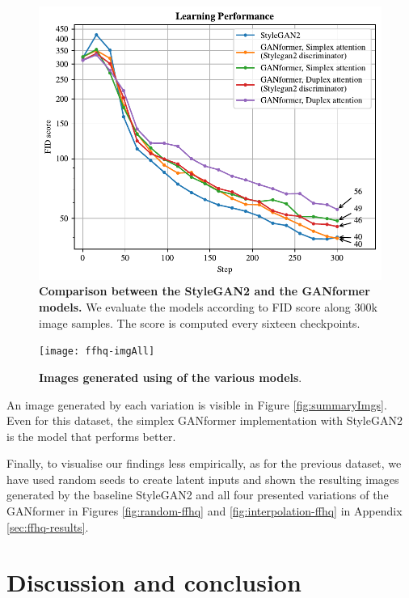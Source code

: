 \documentclass{article}
\begin{document}
\begin{figure}[htpb]				
	\centering
	\includegraphics[width=.6\linewidth]{FIDscore-ffhq.pdf}
	\caption{\textbf{Comparison between the StyleGAN2 and the GANformer models.} We evaluate 
	the models according to FID score along 300k image samples. The score is computed every 
	sixteen checkpoints.}
	\label{fig:performance-ffhq}
\end{figure}

\begin{figure}[htb]
	\centering
	\texttt{[image: ffhq-imgAll]}
	\caption{\textbf{Images generated using of the various models}.} 
	\label{fig:summaryImgs-ffhq}
\end{figure}
An image generated by each variation is visible in Figure \ref{fig:summaryImgs}. Even for this dataset, the simplex GANformer implementation with StyleGAN2 is the model that performs better. 

Finally, to visualise our findings less empirically, as for the previous dataset, we have used random seeds to create latent inputs and shown the resulting images generated by the baseline StyleGAN2 and all four presented variations of the GANformer in Figures \ref{fig:random-ffhq} and \ref{fig:interpolation-ffhq} in Appendix \ref{sec:ffhq-results}.

\section{Discussion and conclusion}
%	
\end{document}
